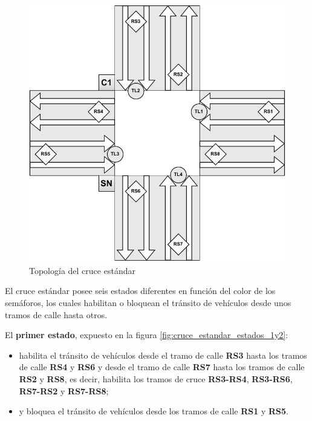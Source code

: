 \begin{figure}[H]
    \centering
    \includegraphics[width=0.75\linewidth]{text/image/DCruc-CE-Topologia.pdf}
    \caption{Topología del cruce estándar}
    \label{fig:cruce_estandar_topologia}
\end{figure}

\newpage
El cruce estándar posee seis estados diferentes en función del color de los semáforos, los cuales habilitan o bloquean el tránsito de vehículos desde unos tramos de calle hasta otros.

El \textbf{primer estado}, expuesto en la figura \ref{fig:cruce_estandar_estados_1y2}:
\begin{itemize}
    \item habilita el tránsito de vehículos desde el tramo de calle \textbf{RS3} hasta los tramos de calle \textbf{RS4} y \textbf{RS6} y desde el tramo de calle \textbf{RS7} hasta los tramos de calle \textbf{RS2} y \textbf{RS8}, es decir, habilita los tramos de cruce \textbf{RS3-RS4}, \textbf{RS3-RS6}, \textbf{RS7-RS2} y \textbf{RS7-RS8};
    \item y bloquea el tránsito de vehículos desde los tramos de calle \textbf{RS1} y \textbf{RS5}.
\end{itemize}

